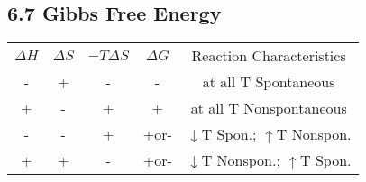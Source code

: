 \subsection{6.7 Gibbs Free Energy}

    
    \begin{center}
        \begin{tabular}{ |c|c|c|c|c| } 
         \hline
         $\Delta H$ & $\Delta S$ & $-T\Delta S$ & $\Delta G$ & Reaction Characteristics \\ 
         - & + & - & - & at all T Spontaneous \\ 
         + & - & + & + & at all T Nonspontaneous \\ 
         - & - & + & +or- & $\downarrow$T Spon.; $\uparrow$T Nonspon.\\
         + & + & - & +or- & $\downarrow$T Nonspon.; $\uparrow$T Spon. \\
         \hline
        \end{tabular}
    \end{center}